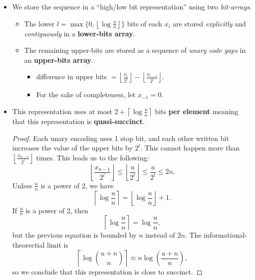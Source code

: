 \documentclass[10pt]{article}
\begin{document}
\begin{itemize}
\item
    We store the sequence in a ``high/low bit representation'' using two \textit{bit-arrays}.
    \begin{itemize}
    \item
        The lower \(l = \max{\lbrace 0, \left \lfloor\log{\frac{u}{n}} \right \rfloor \rbrace }\) 
        bits of each \(x_i\) are stored \textit{explicitly} and \textit{contiguously} in a 
        \textbf{lower-bits array}.
    \item
        The remaining upper-bits are stored as a sequence of \textit{unary code gaps} in an
        \textbf{upper-bits array}.
        \begin{itemize}
        \item
            difference in upper bits 
            \(= \left \lfloor \frac{x_i}{2^l} \right \rfloor 
              - \left \lfloor \frac{x_{i-1}}{2^l} \right \rfloor\).
        \item
            For the sake of completeness, let \(x_{-1} = 0\).
        \end{itemize}
    \end{itemize}
\item
    This representation uses at most \(2 + \left \lceil \log{\frac{u}{n}} \right \rceil\) bits
    \textbf{per element} meaning that this representation is \textbf{quasi-succinct}.
    \begin{proof}
    Each unary encoding uses 1 stop bit, and each other written bit increases the value 
    of the upper bits by \(2^l\). 
    This cannot happen more than
    \( \left \lfloor \frac{x_{n-1}}{2^l} \right \rfloor \) times.
    This leads us to the following:
    \[ \left \lfloor \frac{x_{n-1}}{2^l} \right \rfloor 
       \leq \left \lfloor \frac{u}{2^l} \right \rfloor
       \leq \frac{u}{2^l} \leq 2n. \]
    Unless \(\frac{u}{n}\) is a power of 2, we have 
    \[ \left \lceil \log{\frac{u}{n}} \right \rceil 
       = \left \lfloor \log{\frac{u}{n}} \right \rfloor + 1. \]
    If \(\frac{u}{n}\) is a power of 2, then 
    \[ \left \lceil \log{\frac{u}{n}} \right \rceil = \log{\frac{u}{n}}, \]
    but the previous equation is bounded by \(n\) instead of \(2n\).
    The informational-theorectial limit is
    \[ \left \lceil \log{\binom{u + n}{n}} \right \rceil 
       \approx n \log{\left( \frac{u + n}{n} \right) }, \]
    so we conclude that this representation is close to succinct.
    \end{proof}
\end{itemize}
\end{document}
